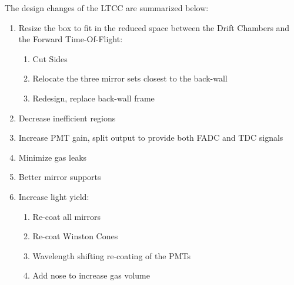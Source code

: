 The design changes of the LTCC are summarized below:

\begin{enumerate}
\item Resize the box to fit in the reduced space between the Drift Chambers and the Forward Time-Of-Flight:
	\begin{enumerate}
		\item Cut Sides
		\item Relocate the three mirror sets closest to the back-wall
		\item Redesign, replace back-wall frame
	\end{enumerate}

	\item Decrease inefficient regions
	\item Increase PMT gain, split output to provide both FADC and TDC signals
	\item Minimize gas leaks
	\item Better mirror supports
	\item Increase light yield:
	\begin{enumerate}
		\item Re-coat all mirrors
		\item Re-coat Winston Cones
		\item Wavelength shifting re-coating of the PMTs
		\item Add nose to increase gas volume
	\end{enumerate}
\end{enumerate}








